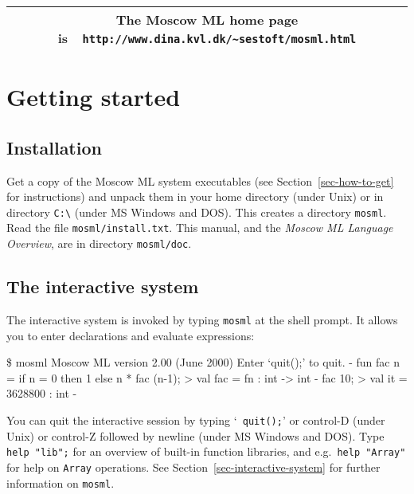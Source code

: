 \documentclass[fleqn]{article}
\begin{document}
\begin{center}
\begin{tabular}{|c|}\hline
\rule[-0.4cm]{0cm}{1cm}The Moscow ML home page is\ \
    \verb$http://www.dina.kvl.dk/~sestoft/mosml.html$\\\hline
\end{tabular}
\end{center}

\vfill

\tableofcontents

\newpage

\section{Getting started}
\label{sec-getting-started}

\subsection{Installation}

Get a copy of the Moscow ML system executables (see
Section~\ref{sec-how-to-get} for instructions) and unpack them in your
home directory (under Unix) or in directory \verb#C:\# (under MS
Windows and DOS)\@.  This creates a directory {\tt mosml}.  Read the
file {\tt mosml/install.txt}.  This manual, and the {\em Moscow ML
  Language Overview\/}, are in directory {\tt mosml/doc}.


\subsection{The interactive system}

The interactive system is invoked by typing {\tt mosml} at the shell
prompt.  It allows you to enter declarations and evaluate expressions:

\begin{program}
\$ mosml
Moscow ML version 2.00 (June 2000)
Enter `quit();' to quit.
-  fun fac n = if n = 0 then 1 else n * fac (n-1);
> val fac = fn : int -> int
-  fac 10;
> val it = 3628800 : int
-
\end{program}

\noindent You can quit the interactive session by typing `{\tt
  quit();}' or control-D (under Unix) or control-Z followed by newline
(under MS Windows and DOS)\@.  Type {\tt help "lib";} for an overview
of built-in function libraries, and e.g.\ {\tt help "Array"} for help
on {\tt Array} operations.  See Section~\ref{sec-interactive-system}
for further information on {\tt mosml}.
\end{document}
